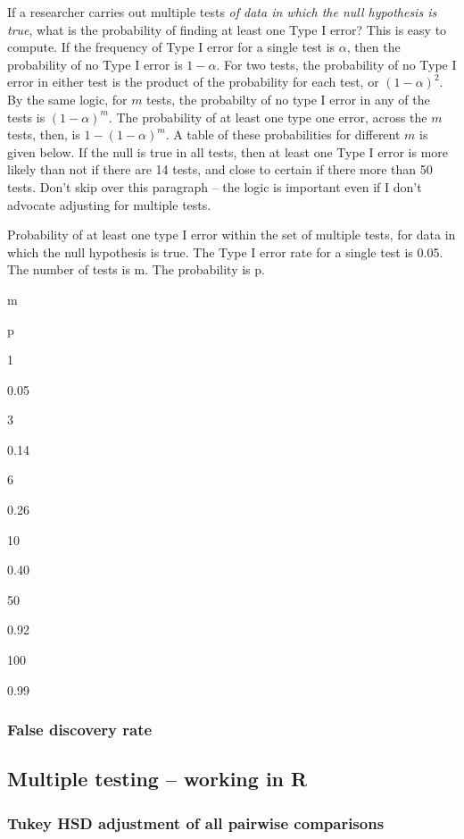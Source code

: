 \documentclass[]{book}
\begin{document}
If a researcher carries out multiple tests \emph{of data in which the
null hypothesis is true}, what is the probability of finding at least
one Type I error? This is easy to compute. If the frequency of Type I
error for a single test is \(\alpha\), then the probability of no Type I
error is \(1 - \alpha\). For two tests, the probability of no Type I
error in either test is the product of the probability for each test, or
\((1 - \alpha)^2\). By the same logic, for \(m\) tests, the probabilty
of no type I error in any of the tests is \((1 - \alpha)^m\). The
probability of at least one type one error, across the \(m\) tests,
then, is \(1 - (1 - \alpha)^m\). A table of these probabilities for
different \(m\) is given below. If the null is true in all tests, then
at least one Type I error is more likely than not if there are 14 tests,
and close to certain if there more than 50 tests. Don't skip over this
paragraph -- the logic is important even if I don't advocate adjusting
for multiple tests.

\label{tab:best-type1-table}Probability of at least one type I error within
the set of multiple tests, for data in which the null hypothesis is
true. The Type I error rate for a single test is 0.05. The number of
tests is m. The probability is p.

m

p

1

0.05

3

0.14

6

0.26

10

0.40

50

0.92

100

0.99

\subsubsection{False discovery rate}\label{false-discovery-rate}

\subsection{Multiple testing -- working in
R}\label{multiple-testing-working-in-r}

\subsubsection{Tukey HSD adjustment of all pairwise
comparisons}\label{tukey-hsd-adjustment-of-all-pairwise-comparisons}
\end{document}

